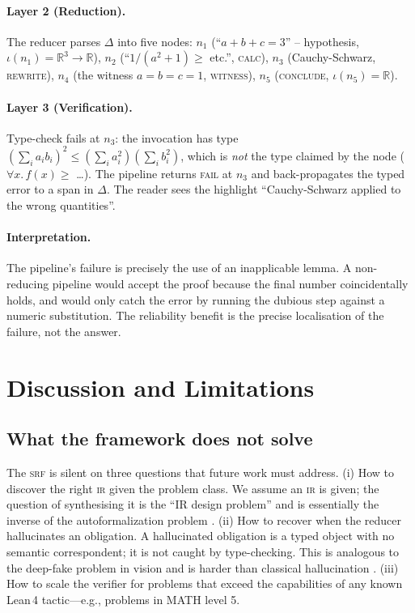 \documentclass[11pt,a4paper]{article}
\newcommand{\IR}{\textsc{ir}}
\newcommand{\IRpipeline}{\textsc{srf}}
\newcommand{\LeanFour}{Lean\,4}
\begin{document}
\paragraph{Layer 2 (Reduction).}  The reducer parses $\Delta$ into
five nodes: $n_1$ (``$a + b + c = 3$'' -- hypothesis,
$\iota(n_1) = \mathbb{R}^3 \to \mathbb{R}$),
$n_2$ (``$1/(a^2+1) \ge$ etc.'', \textsc{calc}),
$n_3$ (Cauchy-Schwarz, \textsc{rewrite}), $n_4$
(the witness $a=b=c=1$, \textsc{witness}), $n_5$ (\textsc{conclude},
$\iota(n_5) = \mathbb{R}$).

\paragraph{Layer 3 (Verification).}  Type-check fails at $n_3$: the
\CauchySchwarz{} invocation has type
$(\sum_i a_i b_i)^2 \le (\sum_i a_i^2)(\sum_i b_i^2)$, which is
\emph{not} the type claimed by the node ($\forall x.\, f(x) \ge$
\ldots). The pipeline returns \textsc{fail} at $n_3$ and
back-propagates the typed error to a span in $\Delta$.  The reader
sees the highlight ``Cauchy-Schwarz applied to the wrong
quantities''.

\paragraph{Interpretation.}  The pipeline's failure is precisely
the use of an inapplicable lemma.  A non-reducing pipeline would
accept the proof because the final number coincidentally holds, and
would only catch the error by running the dubious step against a
numeric substitution.  The reliability benefit is the precise
localisation of the failure, not the answer.

\section{Discussion and Limitations}
\label{sec:discussion}

\subsection{What the framework does not solve}
\label{ssec:limits}

The \IRpipeline{} is silent on three questions that future work
must address.
(i) How to discover the right \IR{} given the problem class. We
assume an \IR{} is given; the question of synthesising it is the
``IR design problem'' and is essentially the inverse of the
autoformalization problem \citep{wu2022autoformalization}.
(ii) How to recover when the reducer hallucinates an obligation.
A hallucinated obligation is a typed object with no semantic
correspondent; it is not caught by type-checking.  This is
analogous to the deep-fake problem in vision and is harder than
classical hallucination \citep{ji2023hallucination}.
(iii) How to scale the verifier for problems that exceed the
capabilities of any known \LeanFour{} tactic---e.g., problems in
MATH level 5.
\end{document}

